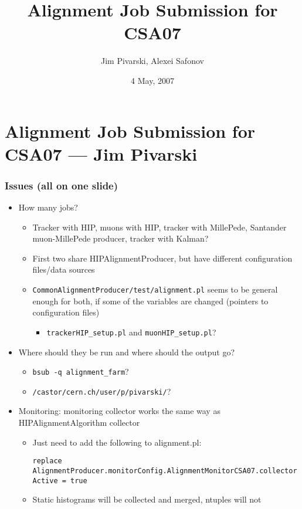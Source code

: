 \documentclass[compress]{beamer}
\title{Alignment Job Submission for CSA07}
\author{Jim Pivarski, Alexei Safonov}
\institute{Texas A\&M University}
\date{4 May, 2007}
\begin{document}
\frame{\titlepage}
\section*{Alignment Job Submission for CSA07 --- Jim Pivarski}

\begin{frame}
\frametitle{Issues (all on one slide)}

\begin{itemize}
\item How many jobs?
\begin{itemize}
  \item Tracker with HIP, muons with HIP, tracker with MillePede, Santander muon-MillePede producer, tracker with Kalman?
  \item First two share HIPAlignmentProducer, but have different configuration files/data sources
  \item {\small \tt CommonAlignmentProducer/test/alignment.pl} seems to be general
  enough for both, if some of the variables are changed (pointers to
  configuration files)
\begin{itemize}
  \item {\small \tt trackerHIP\_setup.pl} and {\small \tt muonHIP\_setup.pl}?
\end{itemize}
\end{itemize}

\item Where should they be run and where should the output go?
\begin{itemize}
  \item {\small \tt bsub -q alignment\_farm}?
  \item {\small \tt /castor/cern.ch/user/p/pivarski/}?
\end{itemize}

\item Monitoring: monitoring collector works the same way as HIPAlignmentAlgorithm collector
\begin{itemize}
  \item Just need to add the following to alignment.pl:
\begin{minipage}{1.5\linewidth}
\hspace{-2.5 cm} \scriptsize \tt replace AlignmentProducer.monitorConfig.AlignmentMonitorCSA07.collectorActive = true
\end{minipage}
  \item Static histograms will be collected and merged, ntuples will not
\end{itemize}
\end{itemize}
\label{numpages}
\end{frame}
\end{document}
